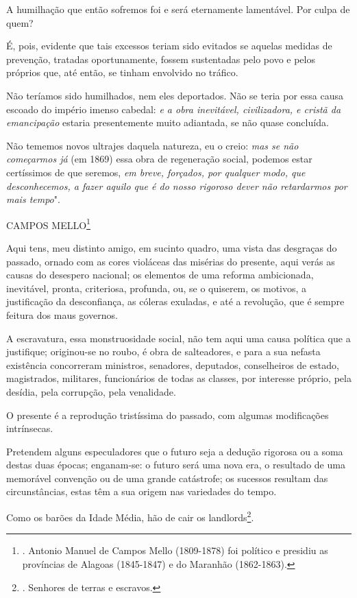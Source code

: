 A humilhação que então sofremos foi e será eternamente lamentável. Por
culpa de quem?

É, pois, evidente que tais excessos teriam sido evitados se aquelas
medidas de prevenção, tratadas oportunamente, fossem sustentadas pelo
povo e pelos próprios que, até então, se tinham envolvido no tráfico.

Não teríamos sido humilhados, nem eles deportados. Não se teria por essa
causa escoado do império imenso cabedal: \emph{e a obra inevitável,
civilizadora, e cristã da emancipação} estaria presentemente muito
adiantada, se não quase concluída.

Não tememos novos ultrajes daquela natureza, eu o creio: \emph{mas se
não começarmos já} (em 1869) essa obra de regeneração social, podemos
estar certíssimos de que seremos, \emph{em breve, forçados, por qualquer
modo, que desconhecemos, a fazer aquilo que é do nosso rigoroso dever
não retardarmos por mais tempo}".

CAMPOS MELLO\footnote{. Antonio Manuel de Campos Mello (1809-1878) foi
  político e presidiu as províncias de Alagoas (1845-1847) e do Maranhão
  (1862-1863).}

Aqui tens, meu distinto amigo, em sucinto quadro, uma vista das
desgraças do passado, ornado com as cores violáceas das misérias do
presente, aqui verás as causas do desespero nacional; os elementos de
uma reforma ambicionada, inevitável, pronta, criteriosa, profunda, ou,
se o quiserem, os motivos, a justificação da desconfiança, as cóleras
exuladas, e até a revolução, que é sempre feitura dos maus governos.

A escravatura, essa monstruosidade social, não tem aqui uma causa
política que a justifique; originou-se no roubo, é obra de salteadores,
e para a sua nefasta existência concorreram ministros, senadores,
deputados, conselheiros de estado, magistrados, militares, funcionários
de todas as classes, por interesse próprio, pela desídia, pela
corrupção, pela venalidade.

O presente é a reprodução tristíssima do passado, com algumas
modificações intrínsecas.

Pretendem alguns especuladores que o futuro seja a dedução rigorosa ou a
soma destas duas épocas; enganam-se: o futuro será uma nova era, o
resultado de uma memorável convenção ou de uma grande catástrofe; os
sucessos resultam das circunstâncias, estas têm a sua origem nas
variedades do tempo.

Como os barões da Idade Média, hão de cair os landlords\footnote{.
  Senhores de terras e escravos.}.

